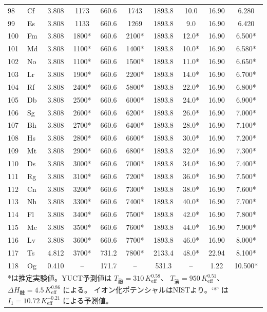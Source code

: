\documentclass[11pt,a4paper]{article}
\begin{document}
\begin{longtable}{@{}llcccccccc@{}}
		98 & Cf  & 3.808 & 1173   & 660.6  & 1743   & 1893.8 & 10.0  & 16.90 & 6.280 \\
		99 & Es  & 3.808 & 1133   & 660.6  & 1269   & 1893.8 & 9.0   & 16.90 & 6.420 \\
		100& Fm  & 3.808 & 1800*  & 660.6  & 2100*  & 1893.8 & 12.0* & 16.90 & 6.500* \\
		101& Md  & 3.808 & 1100*  & 660.6  & 1400*  & 1893.8 & 10.0* & 16.90 & 6.580* \\
		102& No  & 3.808 & 1100*  & 660.6  & 1500*  & 1893.8 & 11.0* & 16.90 & 6.650* \\
		103& Lr  & 3.808 & 1900*  & 660.6  & 2200*  & 1893.8 & 14.0* & 16.90 & 6.700* \\
		104& Rf  & 3.808 & 2400*  & 660.6  & 5800*  & 1893.8 & 22.0* & 16.90 & 6.800* \\
		105& Db  & 3.808 & 2500*  & 660.6  & 6000*  & 1893.8 & 24.0* & 16.90 & 6.900* \\
		106& Sg  & 3.808 & 2600*  & 660.6  & 6200*  & 1893.8 & 26.0* & 16.90 & 7.000* \\
		107& Bh  & 3.808 & 2700*  & 660.6  & 6400*  & 1893.8 & 28.0* & 16.90 & 7.100* \\
		108& Hs  & 3.808 & 2800*  & 660.6  & 6600*  & 1893.8 & 30.0* & 16.90 & 7.200* \\
		109& Mt  & 3.808 & 2900*  & 660.6  & 6800*  & 1893.8 & 32.0* & 16.90 & 7.300* \\
		110& Ds  & 3.808 & 3000*  & 660.6  & 7000*  & 1893.8 & 34.0* & 16.90 & 7.400* \\
		111& Rg  & 3.808 & 3100*  & 660.6  & 7200*  & 1893.8 & 36.0* & 16.90 & 7.500* \\
		112& Cn  & 3.808 & 3200*  & 660.6  & 7300*  & 1893.8 & 38.0* & 16.90 & 7.600* \\
		113& Nh  & 3.808 & 3300*  & 660.6  & 7400*  & 1893.8 & 40.0* & 16.90 & 7.700* \\
		114& Fl  & 3.808 & 3400*  & 660.6  & 7500*  & 1893.8 & 42.0* & 16.90 & 7.800* \\
		115& Mc  & 3.808 & 3500*  & 660.6  & 7600*  & 1893.8 & 44.0* & 16.90 & 7.900* \\
		116& Lv  & 3.808 & 3600*  & 660.6  & 7700*  & 1893.8 & 46.0* & 16.90 & 8.000* \\
		117& Ts  & 4.812 & 3700*  & 731.2  & 7800*  & 2133.4 & 48.0* & 22.94 & 8.100* \\
		118& Og  & 0.410 & --     & 171.7  & --     & 531.3  & --    & 1.22  & 10.500* \\
		\bottomrule
		\multicolumn{10}{p{0.9\textwidth}}{\footnotesize
			*は推定実験値。YUCT予測値は \(T_{\text{融}}=310\,K_{\mathrm{eff}}^{0.58}\)、
			\(T_{\text{沸}}=950\,K_{\mathrm{eff}}^{0.51}\)、
			\(\Delta H_{\text{融}}=4.5\,K_{\mathrm{eff}}^{0.86}\) による。
			イオン化ポテンシャルはNISTより。`*' は \(I_1 = 10.72\,K_{\mathrm{eff}}^{-0.21}\) による予測値。}
	\end{longtable}
	
\end{document}
